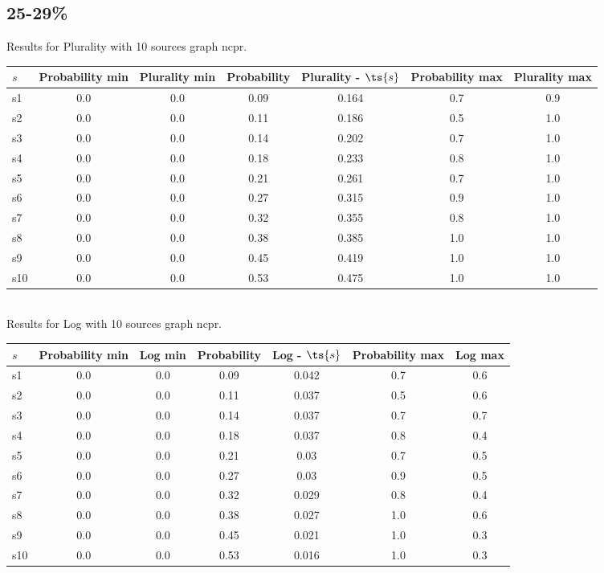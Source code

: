 \documentclass{article}
\begin{document}
\newpage

\subsection{25-29\%}

\noindent Results for Plurality with 10 sources graph ncpr.

\noindent\begin{tabular}{|l|c|c|c|c|c|c|}
\hline
$s$& Probability min & Plurality min & Probability & Plurality - $\ts{s}$ & Probability max & Plurality max\\
\hline
s1 &0.0 & 0.0 & 0.09 & 0.164 & 0.7 & 0.9\\
\hline
s2 &0.0 & 0.0 & 0.11 & 0.186 & 0.5 & 1.0\\
\hline
s3 &0.0 & 0.0 & 0.14 & 0.202 & 0.7 & 1.0\\
\hline
s4 &0.0 & 0.0 & 0.18 & 0.233 & 0.8 & 1.0\\
\hline
s5 &0.0 & 0.0 & 0.21 & 0.261 & 0.7 & 1.0\\
\hline
s6 &0.0 & 0.0 & 0.27 & 0.315 & 0.9 & 1.0\\
\hline
s7 &0.0 & 0.0 & 0.32 & 0.355 & 0.8 & 1.0\\
\hline
s8 &0.0 & 0.0 & 0.38 & 0.385 & 1.0 & 1.0\\
\hline
s9 &0.0 & 0.0 & 0.45 & 0.419 & 1.0 & 1.0\\
\hline
s10 &0.0 & 0.0 & 0.53 & 0.475 & 1.0 & 1.0\\
\hline
\end{tabular}\\

\noindent Results for Log with 10 sources graph ncpr.

\noindent\begin{tabular}{|l|c|c|c|c|c|c|}
\hline
$s$& Probability min & Log min & Probability & Log - $\ts{s}$ & Probability max & Log max\\
\hline
s1 &0.0 & 0.0 & 0.09 & 0.042 & 0.7 & 0.6\\
\hline
s2 &0.0 & 0.0 & 0.11 & 0.037 & 0.5 & 0.6\\
\hline
s3 &0.0 & 0.0 & 0.14 & 0.037 & 0.7 & 0.7\\
\hline
s4 &0.0 & 0.0 & 0.18 & 0.037 & 0.8 & 0.4\\
\hline
s5 &0.0 & 0.0 & 0.21 & 0.03 & 0.7 & 0.5\\
\hline
s6 &0.0 & 0.0 & 0.27 & 0.03 & 0.9 & 0.5\\
\hline
s7 &0.0 & 0.0 & 0.32 & 0.029 & 0.8 & 0.4\\
\hline
s8 &0.0 & 0.0 & 0.38 & 0.027 & 1.0 & 0.6\\
\hline
s9 &0.0 & 0.0 & 0.45 & 0.021 & 1.0 & 0.3\\
\hline
s10 &0.0 & 0.0 & 0.53 & 0.016 & 1.0 & 0.3\\
\hline
\end{tabular}\\
\end{document}
